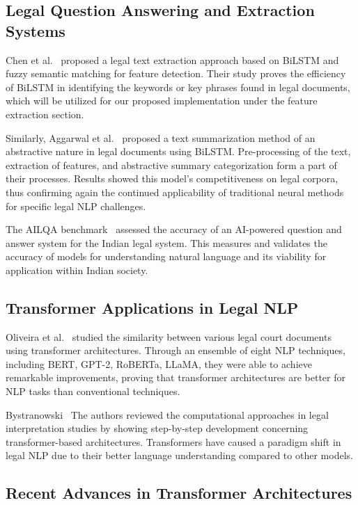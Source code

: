 \documentclass{llncs}
\begin{document}
\subsection{Legal Question Answering and Extraction Systems}

Chen et al.~\cite{chen2025bilstm} proposed a legal text extraction approach based on BiLSTM and fuzzy semantic matching for feature detection. Their study proves the efficiency of BiLSTM in identifying the keywords or key phrases found in legal documents, which will be utilized for our proposed implementation under the feature extraction section.

Similarly, Aggarwal et al.~\cite{aggarwal2025abstractive} proposed a text summarization method of an abstractive nature in legal documents using BiLSTM. Pre-processing of the text, extraction of features, and abstractive summary categorization form a part of their processes. Results showed this model's competitiveness on legal corpora, thus confirming again the continued applicability of traditional neural methods for specific legal NLP challenges.

The AILQA benchmark~\cite{ailqa2024} assessed the accuracy of an AI-powered question and answer system for the Indian legal system. This measures and validates the accuracy of models for understanding natural language and its viability for application within Indian society.

\subsection{Transformer Applications in Legal NLP}

Oliveira et al.~\cite{oliveira2025similarity} studied the similarity between various legal court documents using transformer architectures. Through an ensemble of eight NLP techniques, including BERT, GPT-2, RoBERTa, LLaMA, they were able to achieve remarkable improvements, proving that transformer architectures are better for NLP tasks than conventional techniques.

Bystranowski~\cite{bystranowski2025computational} The authors reviewed the computational approaches in legal interpretation studies by showing step-by-step development concerning transformer-based architectures. Transformers have caused a paradigm shift in legal NLP due to their better language understanding compared to other models.

\subsection{Recent Advances in Transformer Architectures}
\end{document}
